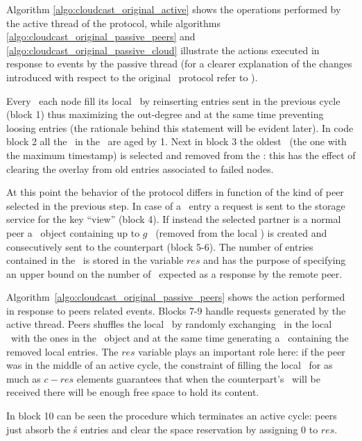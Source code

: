 Algorithm \ref{algo:cloudcast_original_active} shows the operations
performed by the active thread of the protocol, while algorithms
\ref{algo:cloudcast_original_passive_peers} and
\ref{algo:cloudcast_original_passive_cloud} illustrate the actions
executed in response to events by the passive thread (for a clearer
explanation of the changes introduced with respect to the original
\cyclon\ protocol refer to \cite{Cloudcast}).



Every \deltacyclon\ each node fill its local \view\ by reinserting
entries sent in the previous cycle (block 1) thus
maximizing the out-degree and at the same time preventing loosing
entries (the rationale behind this statement will be evident later).
In code block 2 all the \descriptor\ in the \view\ are aged
by 1. Next in block 3 the oldest \descriptor\ (the one with
the maximum timestamp) is selected and removed from the \view: this
has the effect of clearing the overlay from old entries associated to
failed nodes.

At this point the behavior of the protocol differs in function of the kind
of peer selected in the previous step. In case of a \cloud\ entry a
request is sent to the storage service for the key ``view''
(block 4). If instead the selected partner is a normal peer
a \request\ object containing up to $g$ \descriptors\ (removed from the
local \view) is created and consecutively sent to the counterpart
(block 5-6). The number of entries contained in
the \request\ is stored in the variable $res$ and has the purpose of
specifying an upper bound on the number of \descriptor\ expected as a
response by the remote peer.

Algorithm~\ref{algo:cloudcast_original_passive_peers} shows the action
performed in response to peers related
events. Blocks 7-9 handle requests generated by
the active thread. Peers shuffles the local \view\ by randomly exchanging
\descriptors\ in the local \view\ with the ones in the \request\ object
and at the same time generating a \reply\ containing the removed local
entries. The $res$ variable plays an important role here: if the peer
was in the middle of an active cycle, the constraint of filling the
local \view\ for as much as $c - res$ elements guarantees that when
the counterpart's \reply\ will be received there will be enough free
space to hold its content.

In block 10 can be seen the procedure which terminates an
active cycle: peers just absorb the \reply\'s entries and clear the
space reservation by assigning 0 to $res$.

